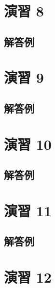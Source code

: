 \documentclass[
  12pt,
]{book}
\begin{document}
\hypertarget{ux6f14ux7fd2-8-1}{%
\section*{演習 8}\label{ux6f14ux7fd2-8-1}}

\hypertarget{ux89e3ux7b54ux4f8b-7}{%
\subsection*{解答例}\label{ux89e3ux7b54ux4f8b-7}}

\hypertarget{ux6f14ux7fd2-9-1}{%
\section*{演習 9}\label{ux6f14ux7fd2-9-1}}

\hypertarget{ux89e3ux7b54ux4f8b-8}{%
\subsection*{解答例}\label{ux89e3ux7b54ux4f8b-8}}

\hypertarget{ux6f14ux7fd2-10-2}{%
\section*{演習 10}\label{ux6f14ux7fd2-10-2}}

\hypertarget{ux89e3ux7b54ux4f8b-9}{%
\subsection*{解答例}\label{ux89e3ux7b54ux4f8b-9}}

\hypertarget{ux6f14ux7fd2-11-1}{%
\section*{演習 11}\label{ux6f14ux7fd2-11-1}}

\hypertarget{ux89e3ux7b54ux4f8b-10}{%
\subsection*{解答例}\label{ux89e3ux7b54ux4f8b-10}}

\hypertarget{ux6f14ux7fd2-12-1}{%
\section*{演習 12}\label{ux6f14ux7fd2-12-1}}
\end{document}
